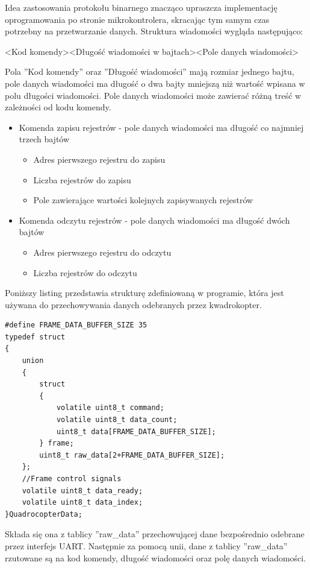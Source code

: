 Idea zastosowania protokołu binarnego znacząco upraszcza implementację oprogramowania po stronie mikrokontrolera, skracając tym samym czas potrzebny na przetwarzanie danych. Struktura wiadomości wygląda następująco:

<Kod komendy><Długość wiadomości w bajtach><Pole danych wiadomości>

Pola ''Kod komendy'' oraz ''Długość wiadomości'' mają rozmiar jednego bajtu, pole danych wiadomości ma długość o dwa bajty mniejszą niż wartość wpisana w polu długości wiadomości.
Pole danych wiadomości może zawierać różną treść w zależności od kodu komendy. 
\begin{itemize}
	\item Komenda zapisu rejestrów - pole danych wiadomości ma długość co najmniej trzech bajtów
	\begin{itemize}
		\item Adres pierwszego rejestru do zapisu
		\item Liczba rejestrów do zapisu
		\item Pole zawierające wartości kolejnych zapisywanych rejestrów
	\end{itemize}
	\item Komenda odczytu rejestrów - pole danych wiadomości ma długość dwóch bajtów
	\begin{itemize}
		\item Adres pierwszego rejestru do odczytu
		\item Liczba rejestrów do odczytu
	\end{itemize} 	
\end{itemize} 

Poniższy listing przedstawia strukturę zdefiniowaną w programie, która jest używana do przechowywania danych odebranych  przez kwadrokopter.

\begin{lstlisting}
#define FRAME_DATA_BUFFER_SIZE 35
typedef struct
{
    union
    {
        struct
        {
            volatile uint8_t command;
            volatile uint8_t data_count;
            uint8_t data[FRAME_DATA_BUFFER_SIZE];
        } frame;
        uint8_t raw_data[2+FRAME_DATA_BUFFER_SIZE];
    };
    //Frame control signals
    volatile uint8_t data_ready;
    volatile uint8_t data_index;
}QuadrocopterData;
\end{lstlisting}

Składa się ona z tablicy ''raw\_data'' przechowującej dane bezpośrednio odebrane przez interfejs UART. Następnie za pomocą unii, dane z tablicy ''raw\_data'' rzutowane są na kod komendy, długość wiadomości oraz polę danych wiadomości.

